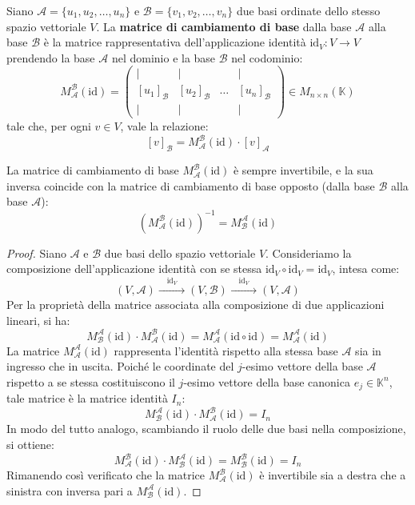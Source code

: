 \begin{definition}
Siano $\mathcal{A} = \{u_1, u_2, \dots, u_n\}$ e $\mathcal{B} = \{v_1, v_2, \dots, v_n\}$ due basi ordinate dello stesso spazio vettoriale $V$. La \textbf{matrice di cambiamento di base} dalla base $\mathcal{A}$ alla base $\mathcal{B}$ è la matrice rappresentativa dell'applicazione identità $\text{id}_V: V \to V$ prendendo la base $\mathcal{A}$ nel dominio e la base $\mathcal{B}$ nel codominio:
\[
M_{\mathcal{A}}^{\mathcal{B}}(\text{id}) = \begin{pmatrix}
| & | & & | \\
[u_1]_{\mathcal{B}} & [u_2]_{\mathcal{B}} & \dots & [u_n]_{\mathcal{B}} \\
| & | & & |
\end{pmatrix} \in M_{n \times n}(\mathbb{K})
\]
tale che, per ogni $v \in V$, vale la relazione:
\[
[v]_{\mathcal{B}} = M_{\mathcal{A}}^{\mathcal{B}}(\text{id}) \cdot [v]_{\mathcal{A}}
\]
\end{definition}

\begin{proposition}
La matrice di cambiamento di base $M_{\mathcal{A}}^{\mathcal{B}}(\text{id})$ è sempre invertibile, e la sua inversa coincide con la matrice di cambiamento di base opposto (dalla base $\mathcal{B}$ alla base $\mathcal{A}$):
\[
\left( M_{\mathcal{A}}^{\mathcal{B}}(\text{id}) \right)^{-1} = M_{\mathcal{B}}^{\mathcal{A}}(\text{id})
\]
\end{proposition}

\begin{proof}
Siano $\mathcal{A}$ e $\mathcal{B}$ due basi dello spazio vettoriale $V$. Consideriamo la composizione dell'applicazione identità con se stessa $\text{id}_V \circ \text{id}_V = \text{id}_V$, intesa come:
\[
(V, \mathcal{A}) \xrightarrow{\quad \text{id}_V \quad} (V, \mathcal{B}) \xrightarrow{\quad \text{id}_V \quad} (V, \mathcal{A})
\]
Per la proprietà della matrice associata alla composizione di due applicazioni lineari, si ha:
\[
M_{\mathcal{B}}^{\mathcal{A}}(\text{id}) \cdot M_{\mathcal{A}}^{\mathcal{B}}(\text{id}) = M_{\mathcal{A}}^{\mathcal{A}}(\text{id} \circ \text{id}) = M_{\mathcal{A}}^{\mathcal{A}}(\text{id})
\]
La matrice $M_{\mathcal{A}}^{\mathcal{A}}(\text{id})$ rappresenta l'identità rispetto alla stessa base $\mathcal{A}$ sia in ingresso che in uscita. Poiché le coordinate del $j$-esimo vettore della base $\mathcal{A}$ rispetto a se stessa costituiscono il $j$-esimo vettore della base canonica $e_j \in \mathbb{K}^n$, tale matrice è la matrice identità $I_n$:
\[
M_{\mathcal{B}}^{\mathcal{A}}(\text{id}) \cdot M_{\mathcal{A}}^{\mathcal{B}}(\text{id}) = I_n
\]
In modo del tutto analogo, scambiando il ruolo delle due basi nella composizione, si ottiene:
\[
M_{\mathcal{A}}^{\mathcal{B}}(\text{id}) \cdot M_{\mathcal{B}}^{\mathcal{A}}(\text{id}) = M_{\mathcal{B}}^{\mathcal{B}}(\text{id}) = I_n
\]
Rimanendo così verificato che la matrice $M_{\mathcal{A}}^{\mathcal{B}}(\text{id})$ è invertibile sia a destra che a sinistra con inversa pari a $M_{\mathcal{B}}^{\mathcal{A}}(\text{id})$.
\end{proof}